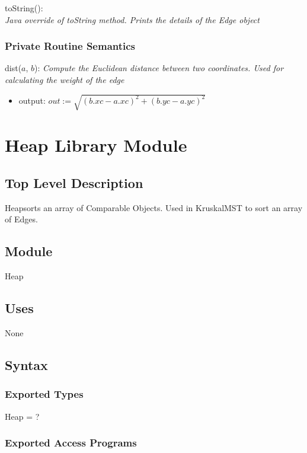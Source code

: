 \documentclass[12pt]{article}
\begin{document}
\noindent
toString():\\
\textit{Java override of toString method. Prints the details of the Edge object}

\subsubsection* {Private Routine Semantics}
dist($a$, $b$):
\textit{Compute the Euclidean distance between two coordinates. Used for calculating the weight
of the edge}
\begin{itemize}
\item output: $out := \sqrt{(b.xc-a.xc)^{2} + (b.yc-a.yc)^{2}}$
\end{itemize}

\newpage

\section*{Heap Library Module}

\subsection* {Top Level Description}

Heapsorts an array of Comparable Objects. Used in KruskalMST to sort an array of Edges.

\subsection*{Module}

Heap

\subsection* {Uses}

None

\subsection* {Syntax}

\subsubsection* {Exported Types}

Heap = ?

\subsubsection* {Exported Access Programs}
\end{document}
